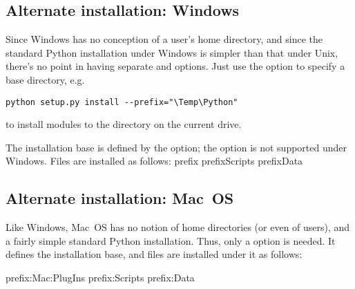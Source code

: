 \documentclass{howto}
\begin{document}
\subsection{Alternate installation: Windows}
\label{sec:alt-windows}

Since Windows has no conception of a user's home directory, and since
the standard Python installation under Windows is simpler than that
under Unix, there's no point in having separate  and
 options.  Just use the  option to specify
a base directory, e.g.
\begin{verbatim}
python setup.py install --prefix="\Temp\Python"
\end{verbatim}
to install modules to the  directory on the current
drive.

The installation base is defined by the  option; the
 option is not supported under Windows.  Files are
installed as follows:
              {prefix}{}
              {prefix}{\bslash{}Scripts}
              {prefix}{\bslash{}Data}


\subsection{Alternate installation: Mac~OS}
\label{sec:alt-macos}

Like Windows, Mac~OS has no notion of home directories (or even of
users), and a fairly simple standard Python installation.  Thus, only a
 option is needed.  It defines the installation base, and 
files are installed under it as follows:


              {prefix}{:Mac:PlugIns}
              {prefix}{:Scripts}
              {prefix}{:Data}

\end{document}

